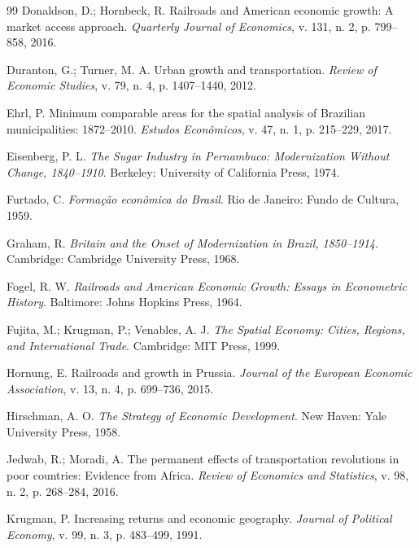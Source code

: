 \documentclass[12pt,a4paper]{article}
\begin{document}
\begin{thebibliography}{99}
Donaldson, D.; Hornbeck, R. Railroads and American economic growth: A market access approach. \textit{Quarterly Journal of Economics}, v. 131, n. 2, p. 799--858, 2016.


Duranton, G.; Turner, M. A. Urban growth and transportation. \textit{Review of Economic Studies}, v. 79, n. 4, p. 1407--1440, 2012.

Ehrl, P. Minimum comparable areas for the spatial analysis of Brazilian municipalities: 1872--2010. \textit{Estudos Econômicos}, v. 47, n. 1, p. 215--229, 2017.

Eisenberg, P. L. \textit{The Sugar Industry in Pernambuco: Modernization Without Change, 1840--1910}. Berkeley: University of California Press, 1974.

Furtado, C. \textit{Formação econômica do Brasil}. Rio de Janeiro: Fundo de Cultura, 1959.

Graham, R. \textit{Britain and the Onset of Modernization in Brazil, 1850--1914}. Cambridge: Cambridge University Press, 1968.

Fogel, R. W. \textit{Railroads and American Economic Growth: Essays in Econometric History}. Baltimore: Johns Hopkins Press, 1964.


Fujita, M.; Krugman, P.; Venables, A. J. \textit{The Spatial Economy: Cities, Regions, and International Trade}. Cambridge: MIT Press, 1999.


Hornung, E. Railroads and growth in Prussia. \textit{Journal of the European Economic Association}, v. 13, n. 4, p. 699--736, 2015.


Hirschman, A. O. \textit{The Strategy of Economic Development}. New Haven: Yale University Press, 1958.

Jedwab, R.; Moradi, A. The permanent effects of transportation revolutions in poor countries: Evidence from Africa. \textit{Review of Economics and Statistics}, v. 98, n. 2, p. 268--284, 2016.


Krugman, P. Increasing returns and economic geography. \textit{Journal of Political Economy}, v. 99, n. 3, p. 483--499, 1991.


\end{thebibliography}
\end{document}
